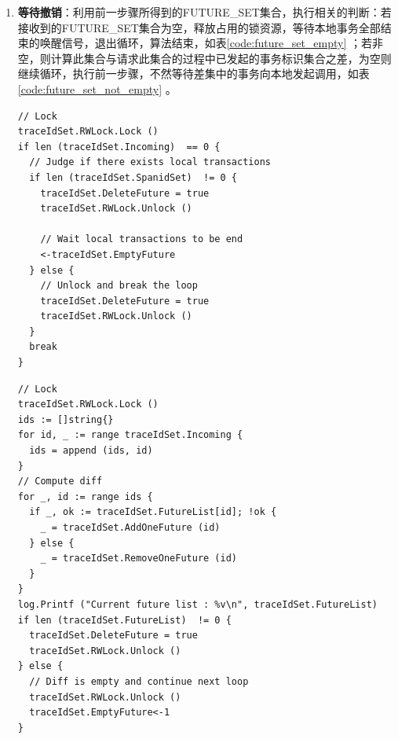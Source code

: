 \documentclass[macfonts,master]{njuthesis}
\begin{document}
\begin{enumerate}

	\item \textbf{等待撤销}：利用前一步骤所得到的FUTURE\_SET集合，执行相关的判断：若接收到的FUTURE\_SET集合为空，释放占用的锁资源，等待本地事务全部结束的唤醒信号，退出循环，算法结束，如表\ref{code:future_set_empty} ；若非空，则计算此集合与请求此集合的过程中已发起的事务标识集合之差，为空则继续循环，执行前一步骤，不然等待差集中的事务向本地发起调用，如表\ref{code:future_set_not_empty} 。

\begin{lstlisting}[caption={接收集合为空代码片段}, label={code:future_set_empty}, style=golangStyle]
// Lock
traceIdSet.RWLock.Lock () 
if len (traceIdSet.Incoming)  == 0 {
  // Judge if there exists local transactions
  if len (traceIdSet.SpanidSet)  != 0 {
    traceIdSet.DeleteFuture = true
    traceIdSet.RWLock.Unlock () 

    // Wait local transactions to be end
    <-traceIdSet.EmptyFuture
  } else {
    // Unlock and break the loop
    traceIdSet.DeleteFuture = true
    traceIdSet.RWLock.Unlock () 
  }
  break
}
\end{lstlisting}


\begin{lstlisting}[caption={等待撤销代码片段}, label={code:future_set_not_empty}, style=golangStyle]
// Lock
traceIdSet.RWLock.Lock () 
ids := []string{}
for id, _ := range traceIdSet.Incoming {
  ids = append (ids, id) 
}
// Compute diff
for _, id := range ids {
  if _, ok := traceIdSet.FutureList[id]; !ok {
    _ = traceIdSet.AddOneFuture (id) 
  } else {
    _ = traceIdSet.RemoveOneFuture (id) 
  }
}
log.Printf ("Current future list : %v\n", traceIdSet.FutureList) 
if len (traceIdSet.FutureList)  != 0 {
  traceIdSet.DeleteFuture = true
  traceIdSet.RWLock.Unlock () 
} else {
  // Diff is empty and continue next loop
  traceIdSet.RWLock.Unlock () 
  traceIdSet.EmptyFuture<-1
}
\end{lstlisting}

\end{enumerate}
\end{document}
